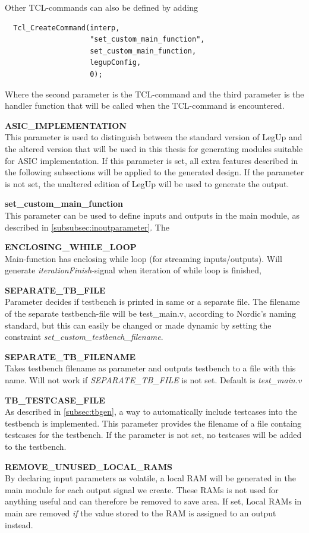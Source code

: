 Other TCL-commands can also be defined by adding 
\begin{lstlisting}
  Tcl_CreateCommand(interp,
                    "set_custom_main_function",
                    set_custom_main_function,
                    legupConfig,
                    0);
\end{lstlisting}
Where the second parameter is the TCL-command and the third parameter is the handler function that will be called when the TCL-command is encountered.

\begin{description}
\item{\textbf{ASIC\_IMPLEMENTATION}} \hfill \\
This parameter is used to distinguish between the standard version of LegUp and the altered version that will be used in this thesis for generating modules suitable for ASIC implementation. If this parameter is set, all extra features described in the following subsections will be applied to the generated design. If the parameter is not set, the unaltered edition of LegUp will be used to generate the output.
\item{\textbf{set\_custom\_main\_function}} \hfill \\
This parameter can be used to define inputs and outputs in the main module, as described in \cref{subsubsec:inoutparameter}. The  
\item{\textbf{ENCLOSING\_WHILE\_LOOP}} \hfill \\
Main-function has enclosing while loop (for streaming inputs/outputs). Will generate \textit{iterationFinish}-signal when iteration of while loop is finished,
\item{\textbf{SEPARATE\_TB\_FILE}} \hfill \\
Parameter decides if testbench is printed in same or a separate file. The filename of the separate testbench-file will be test\_main.v, according to Nordic's naming standard, but this can easily be changed or made dynamic by setting the constraint \textit{set\_custom\_testbench\_filename}.
\item{\textbf{SEPARATE\_TB\_FILENAME}} \hfill \\
Takes testbench filename as parameter and outputs testbench to a file with this name. Will not work if \textit{SEPARATE\_TB\_FILE} is not set. Default is \textit{test\_main.v}
\item{\textbf{TB\_TESTCASE\_FILE}} \hfill \\
As described in \cref{subsec:tbgen}, a way to automatically include testcases into the testbench is implemented. This parameter provides the filename of a file containg testcases for the testbench. If the parameter is not set, no testcases will be added to the testbench.
\item{\textbf{REMOVE\_UNUSED\_LOCAL\_RAMS}} \hfill \\
By declaring input parameters as volatile, a local RAM will be generated in the main module for each output signal we create. These RAMs is not used for anything useful and can therefore be removed to save area. If set, Local RAMs in main are removed \textit{if} the value stored to the RAM is assigned to an output instead.
\end{description}

